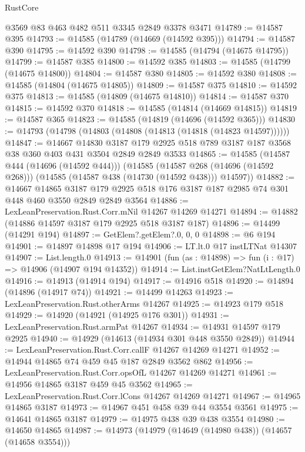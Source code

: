 \begin{lexlean}{RustCore}
\begin{coremodule}
    @3569
    @83
    @463
    @482
    @511
    @3345
    @2849
    @3378
    @3471
@14789 := @14587 @395
@14793 := @14585 (@14789 (@14669 (@14592 @395)))
@14794 := @14587 @390
@14795 := @14592 @390
@14798 := @14585 (@14794 (@14675 @14795))
@14799 := @14587 @385
@14800 := @14592 @385
@14803 := @14585 (@14799 (@14675 @14800))
@14804 := @14587 @380
@14805 := @14592 @380
@14808 := @14585 (@14804 (@14675 @14805))
@14809 := @14587 @375
@14810 := @14592 @375
@14813 := @14585 (@14809 (@14675 @14810))
@14814 := @14587 @370
@14815 := @14592 @370
@14818 := @14585 (@14814 (@14669 @14815))
@14819 := @14587 @365
@14823 := @14585 (@14819 (@14696 (@14592 @365)))
@14830 := @14793 (@14798 (@14803 (@14808 (@14813 (@14818 (@14823 @14597))))))
@14847 := @14667
    @14830
    @3187
    @179
    @2925
    @518
    @789
    @3187
    @187
    @3568
    @38
    @360
    @403
    @431
    @3504
    @2849
    @2849
    @3533
@14865 := @14585
    (@14587 @444 (@14696 (@14592 @444)))
    (@14585
      (@14587 @268 (@14696 (@14592 @268)))
      (@14585 (@14587 @438 (@14730 (@14592 @438))) @14597))
@14882 := @14667
    @14865
    @3187
    @179
    @2925
    @518
    @176
    @3187
    @187
    @2985
    @74
    @301
    @448
    @460
    @3550
    @2849
    @2849
    @3564
@14886 := LexLeanPreservation.Rust.Corr.mNil @14267 @14269 @14271
@14894 := @14882 (@14886 @14597 @3187 @179 @2925 @518 @3187 @187)
@14896 := @14499 (@14291 @194)
@14897 := GetElem?.getElem?.{0, 0, 0}
@14898 := @6 @194
@14901 := @14897 @14898 @17 @194
@14906 := LT.lt.{0} @17 instLTNat @14307
@14907 := List.length.{0}
@14913 := @14901 (fun (as : @14898) => fun (i : @17) => @14906 (@14907 @194 @14352))
@14914 := List.instGetElem?NatLtLength.{0}
@14916 := @14913 (@14914 @194)
@14917 := @14916 @518
@14920 := @14894 (@14896 (@14917 @74))
@14921 := @14499 @14263
@14923 := LexLeanPreservation.Rust.otherArms @14267
@14925 := @14923 @179 @518
@14929 := @14920 (@14921 (@14925 @176 @301))
@14931 := LexLeanPreservation.Rust.armPat @14267
@14934 := @14931 @14597 @179 @2925
@14940 := @14929 (@14613 (@14934 @301 @448 @3550 @2849))
@14944 := LexLeanPreservation.Rust.Corr.callF @14267 @14269 @14271
@14952 := @14944 @14865 @74 @459 @45 @187 @2849 @3562 @862
@14956 := LexLeanPreservation.Rust.Corr.opsOfL @14267 @14269 @14271
@14961 := @14956 @14865 @3187 @459 @45 @3562
@14965 := LexLeanPreservation.Rust.Corr.lCons @14267 @14269 @14271
@14967 := @14965 @14865 @3187
@14973 := @14967 @451 @458 @39 @44 @3554 @3561
@14975 := @14641 @14865 @3187
@14979 := @14975 @438 @39 @438 @3554
@14980 := @14650 @14865
@14987 := @14973 (@14979 (@14649 (@14980 @438)) (@14657 (@14658 @3554)))

\end{coremodule}
\end{lexlean}
